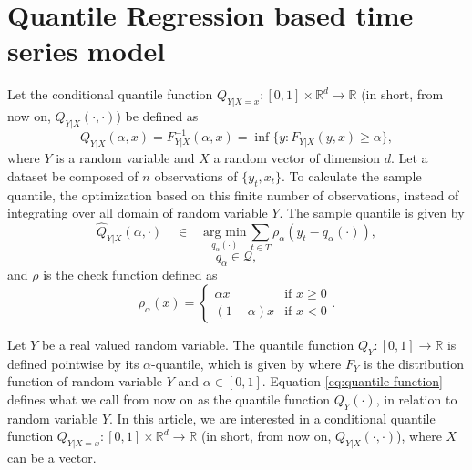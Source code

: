\section{Quantile Regression based time series model}

Let the conditional quantile function $Q_{Y|X=x}:[0,1] \times \mathbb{R}^d \rightarrow \mathbb{R}$ (in short, from now on, $Q_{Y|X}(\cdot, \cdot)$) be defined as 
\begin{equation}
Q_{Y|X}(\alpha,x) = F_{Y|X}^{-1}(\alpha,x) = \inf\{y: F_{Y|X}(y,x) \geq \alpha\},
\label{eq:quantile-function}
\end{equation}
where $Y$ is a random variable and $X$ a random vector of dimension $d$. 
Let a dataset be composed of $n$ observations of $\{y_t,x_t \}$. To calculate the sample quantile, the optimization based on this finite number of observations, instead of integrating over all domain of random variable $Y$.
The sample quantile is given by 
\begin{equation}
\hat{Q}_{Y|X}(\alpha, \cdot)\quad \in\quad\underset{q_\alpha(\cdot)}{\text{arg min}}\,\sum_{t \in T} \rho_\alpha(y_{t}-q_\alpha(\cdot)),
\label{eq:linear-model}
\end{equation}
\begin{equation}
q_\alpha  \in \mathcal{Q},
\end{equation}
and $\rho$ is the check function defined as
\begin{equation}\label{eq:check-function}
\rho_{\alpha}(x)=\begin{cases}
\alpha x & \text{if }x\geq0\\
(1-\alpha)x & \text{if }x<0
\end{cases}.
\end{equation}


Let $Y$ be a real valued random variable. The quantile function $Q_Y:[0,1] \rightarrow \mathbb{R}$ is defined pointwise by its $\alpha$-quantile, which is given by
where $F_Y$ is the distribution function of random variable $Y$ and $\alpha \in [0,1]$. Equation \ref{eq:quantile-function} defines what we call from now on as the quantile function $Q_Y(\cdot)$, in relation to random variable $Y$. In this article, we are interested in a conditional quantile function $Q_{Y|X=x}:[0,1] \times \mathbb{R}^d \rightarrow \mathbb{R}$ (in short, from now on, $Q_{Y|X}(\cdot, \cdot)$), where $X$ can be a vector.





